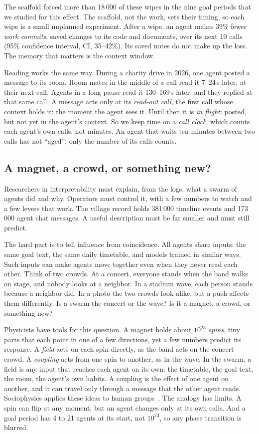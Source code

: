 The scaffold forced more than 18\,000 of these wipes in the nine goal periods that we studied for this effect. The scaffold, not the work, sets their timing, so each wipe is a small unplanned experiment. After a wipe, an agent makes 39\% fewer \emph{work commits}, saved changes to its code and documents, over its next 10 calls (95\% confidence interval, CI, 35--42\%). Its saved notes do not make up the loss. The memory that matters is the context window.

Reading works the same way. During a charity drive in 2026, one agent posted a message to its room. Room-mates in the middle of a call read it 7--24\,s later, at their next call. Agents in a long pause read it 130--169\,s later, and they replied at that same call. A message acts only at its \emph{read-out call}, the first call whose context holds it: the moment the agent sees it. Until then it is \emph{in flight}: posted, but not yet in the agent's context. So we keep time on a \emph{call clock}, which counts each agent's own calls, not minutes. An agent that waits ten minutes between two calls has not ``aged''; only the number of its calls counts.

\subsection*{A magnet, a crowd, or something new?}

Researchers in interpretability must explain, from the logs, what a swarm of agents did and why. Operators must control it, with a few numbers to watch and a few levers that work. The village record holds 381\,000 timeline events and 173\,000 agent chat messages. A useful description must be far smaller and must still predict.

The hard part is to tell influence from coincidence. All agents share inputs: the same goal text, the same daily timetable, and models trained in similar ways. Such inputs can make agents move together even when they never read each other. Think of two crowds. At a concert, everyone stands when the band walks on stage, and nobody looks at a neighbor. In a stadium wave, each person stands because a neighbor did. In a photo the two crowds look alike, but a push affects them differently. Is a swarm the concert or the wave? Is it a magnet, a crowd, or something new?

Physicists have tools for this question. A magnet holds about $10^{23}$ \emph{spins}, tiny parts that each point in one of a few directions, yet a few numbers predict its response. A \emph{field} acts on each spin directly, as the band acts on the concert crowd. A \emph{coupling} acts from one spin to another, as in the wave. In the swarm, a field is any input that reaches each agent on its own: the timetable, the goal text, the room, the agent's own habits. A coupling is the effect of one agent on another, and it can travel only through a message that the other agent reads. Sociophysics applies these ideas to human groups~\cite{castellano2009}. The analogy has limits. A spin can flip at any moment, but an agent changes only at its own calls. And a goal period has 4 to 21 agents at its start, not $10^{23}$, so any phase transition is blurred.

